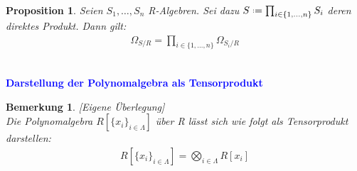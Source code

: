 \documentclass[10pt,a4paper]{report}
\newcounter{Aussage}[chapter]
\newtheorem{prop}[Aussage]{Proposition}
\newtheorem{bem}[Aussage]{Bemerkung}
\newcommand{\divR}[2]{\Omega_{#1/#2}}
\newcommand*{\defeq}{\mathrel{\vcenter{\baselineskip0.5ex \lineskiplimit0pt
                     \hbox{\scriptsize.}\hbox{\scriptsize.}}}%
                     =}
\begin{document}
\ \\
\begin{prop}\label{NNDifferenzial des Produktes von Algebren}
Seien $S_1, \dots , S_n$ R-Algebren. Sei dazu $S \defeq \prod_{i \in \lbrace 1, \dots , n \rbrace} S_i$ deren direktes Produkt.
Dann gilt:
\begin{gather*}
\divR{S}{R} = \prod_{i \in \lbrace 1, \dots , n \rbrace} \divR{S_i}{R}
\end{gather*}
\end{prop}


\ \\
\textcolor{blue}{\textbf{Darstellung der Polynomalgebra als Tensorprodukt}}
\begin{bem}\label{Darstellung der Polynomalgebra als Tensorprodukt}\textit{[Eigene Überlegung]}\\
Die Polynomalgebra $R[\lbrace x_i \rbrace_{i \in \Lambda}]$ über R lässt sich wie folgt als Tensorprodukt darstellen:
\begin{gather*}
R[\lbrace x_i \rbrace_{i \in  \Lambda}] = \bigotimes_{i \in \Lambda} R[x_i]
\end{gather*}
\end{bem}
\end{document}
